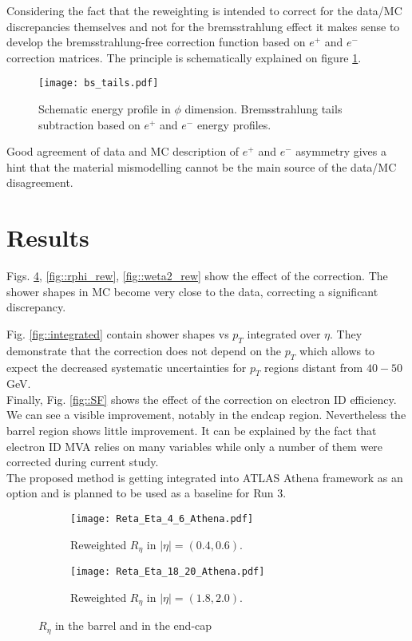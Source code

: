   
  Considering the fact that the reweighting is intended to correct for the data/MC discrepancies themselves and not for the bremsstrahlung effect it makes sense to develop the bremsstrahlung-free correction function based on $e^+$ and $e^-$ correction matrices. The principle is schematically explained on figure \ref{bstails}.\\
  \begin{figure}[htbp]
  	\begin{center}\texttt{[image: bs\_tails.pdf]}\end{center}
  	\caption{Schematic energy profile in $\phi$ dimension. Bremsstrahlung tails subtraction based on $e^+$ and $e^-$ energy profiles.}
  	\label{bstails}
  \end{figure}
  Good agreement of data and MC description of $e^+$ and $e^-$ asymmetry gives a hint that the material mismodelling cannot be the main source of the data/MC disagreement.\\
  
  \section{Results}
  Figs. \ref{fig::reta}, \ref{fig::rphi_rew}, \ref{fig::weta2_rew} show the effect of the correction. The shower shapes in MC become very close to the data, correcting a significant discrepancy. 
  
  Fig. \ref{fig::integrated} contain shower shapes vs $p_T$ integrated over $\eta$. They demonstrate that the correction does not depend on the $p_T$ which allows to expect the decreased systematic uncertainties for $p_T$ regions distant from $40-50$GeV.\\
  Finally, Fig. \ref{fig::SF} shows the effect of the correction on electron ID efficiency. We can see a visible improvement, notably in the endcap region.
  Nevertheless the barrel region shows little improvement. It can be explained by the fact that electron ID MVA relies on many variables while only a number of them were corrected during current study.\\
  The proposed method is getting integrated into ATLAS Athena framework as an option and is planned to be used as a baseline for Run 3. 
  
  	\begin{figure}[htbp]
  	\begin{subfigure}[t]{0.5\textwidth}
  		\texttt{[image: Reta\_Eta\_4\_6\_Athena.pdf]}
  		\caption{Reweighted  $R_{\eta }$ in $|\eta| = (0.4,0.6)$.  }
  		\label{fig::idreta}
  	\end{subfigure}
  	\hfill
  	\begin{subfigure}[t]{0.5\textwidth} 
  		\texttt{[image: Reta\_Eta\_18\_20\_Athena.pdf]}
  		\caption{Reweighted  $R_{\eta }$ in $|\eta| = (1.8,2.0)$.  }
  		\label{fig::pdreta}
  	\end{subfigure}
  	\caption{$R_{\eta }$  in the barrel and in the end-cap}
  	\label{fig::reta}
  \end{figure}
 
